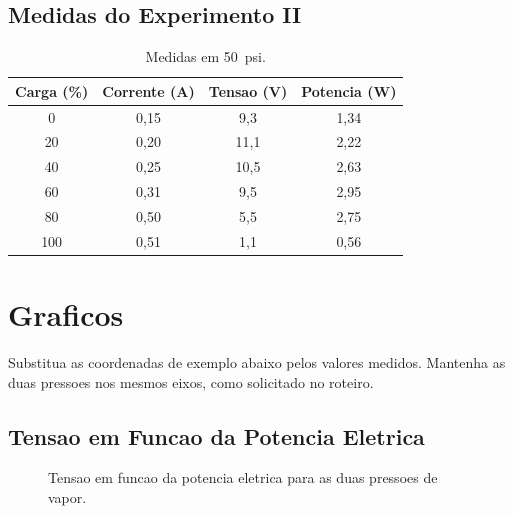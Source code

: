 \documentclass[12pt,a4paper]{article}
\begin{document}
\subsection{Medidas do Experimento II}

\begin{table}[H]
  \centering
  \caption{Medidas em \SI{50}{psi}.}
  \label{tab:50psi}
  \begin{tabular}{S[table-format=3.0] S[table-format=2.3] S[table-format=3.2] S[table-format=3.2]}
    \toprule
    {Carga (\%)} & {Corrente (\si{\ampere})} & {Tensao (\si{\volt})} & {Potencia (\si{\watt})} \\
       & {0,15} & {9,3} & {1,34} \\
    20  & {0,20} & {11,1} & {2,22} \\
    40  & {0,25} & {10,5} & {2,63} \\
    60  & {0,31} & {9,5} & {2,95} \\
    80  & {0,50} & {5,5} & {2,75} \\
    100 & {0,51} & {1,1} & {0,56} \\
    \bottomrule
  \end{tabular}
\end{table}

\section{Graficos}

Substitua as coordenadas de exemplo abaixo pelos valores medidos. Mantenha as duas pressoes nos mesmos eixos, como solicitado no roteiro.

\subsection{Tensao em Funcao da Potencia Eletrica}

\begin{figure}[H]
  \centering
  \caption{Tensao em funcao da potencia eletrica para as duas pressoes de vapor.}
  \label{fig:voltage-power}
\end{figure}
\end{document}
